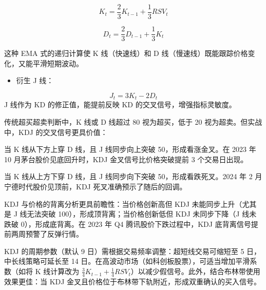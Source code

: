 \documentclass[]{ctexbook}
\newenvironment{Shaded}{\begin{snugshade}}{\end{snugshade}}
\newcommand{\AttributeTok}[1]{\textcolor[rgb]{0.13,0.29,0.53}{#1}}
\newcommand{\CommentTok}[1]{\textcolor[rgb]{0.56,0.35,0.01}{\textit{#1}}}
\newcommand{\FunctionTok}[1]{\textcolor[rgb]{0.13,0.29,0.53}{\textbf{#1}}}
\newcommand{\NormalTok}[1]{#1}
\newcommand{\OtherTok}[1]{\textcolor[rgb]{0.56,0.35,0.01}{#1}}
\newcommand{\SpecialCharTok}[1]{\textcolor[rgb]{0.81,0.36,0.00}{\textbf{#1}}}
\newcommand{\StringTok}[1]{\textcolor[rgb]{0.31,0.60,0.02}{#1}}
\providecommand{\tightlist}{%
  \setlength{\itemsep}{0pt}\setlength{\parskip}{0pt}}
\begin{document}
\[
K_t = \frac{2}{3}K_{t-1} + \frac{1}{3}RSV_t
\]

\[
D_t = \frac{2}{3}D_{t-1} + \frac{1}{3}K_t
\]

这种 EMA 式的递归计算使 K 线（快速线）和 D 线（慢速线）既能跟踪价格变化，又能平滑短期波动。

\begin{itemize}
\tightlist
\item
  衍生 J 线：
\end{itemize}

\[
J_t = 3K_t - 2D_t
\]
J 线作为 KD 的修正值，能提前反映 KD 的交叉信号，增强指标灵敏度。

传统超买超卖判断中，K 线或 D 线超过 80 视为超买，低于 20 视为超卖。但实战中，KDJ 的交叉信号更具价值：

当 K 线从下方上穿 D 线，且 J 线同步向上突破 50，形成看涨金叉。在 2023 年 10 月茅台股价见底回升时，KDJ 金叉信号比价格突破提前 3 个交易日出现。

当 K 线从上方下穿 D 线，且 J 线同步向下突破 50，形成看跌死叉。2024 年 2 月宁德时代股价见顶前，KDJ 死叉准确预示了随后的回调。

KDJ 与价格的背离分析更具前瞻性：当价格创新高但 KDJ 未能同步上升（尤其是 J 线无法突破 100），形成顶背离；当价格创新低但 KDJ 未同步下降（J 线未跌破 0），形成底背离。在 2023 年 Q4 腾讯股价下跌过程中，KDJ 底背离信号提前两周预警了反弹行情。

KDJ 的周期参数（默认 9 日）需根据交易频率调整：超短线交易可缩短至 5 日，中长线策略可延长至 14 日。在高波动市场（如科创板股票），可适当增加平滑系数（如将 K 线计算改为 \(\frac{3}{4}K_{t-1} + \frac{1}{4}RSV_t\)）以减少假信号。此外，结合布林带使用效果更佳：当 KDJ 金叉且价格位于布林带下轨附近，形成双重确认的买入信号。

\begin{Shaded}
\end{Shaded}
\end{document}
